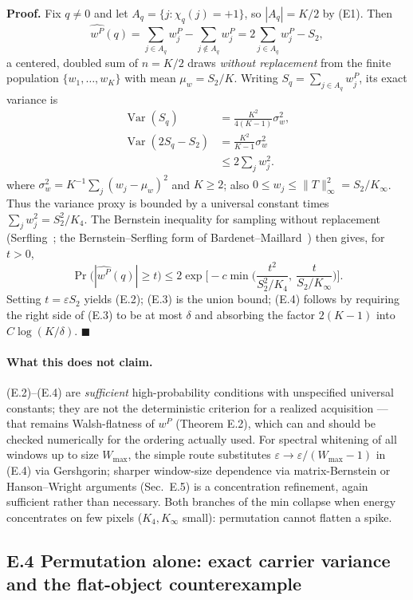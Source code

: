 \noindent\textbf{Proof.} Fix $q\neq0$ and let $A_q=\{j:\chi_q(j)=+1\}$, so $|A_q|=K/2$ by (E1). Then
\[
\widehat{w^P}(q)=\sum_{j\in A_q}w^P_j-\sum_{j\notin A_q}w^P_j=2\sum_{j\in A_q}w^P_j-S_2,
\]
a centered, doubled sum of $n=K/2$ draws \emph{without replacement} from the finite population $\{w_1,\dots,w_K\}$ with mean $\mu_w=S_2/K$. Writing $S_q=\sum_{j\in A_q}w_j^P$, its exact variance is
\[
\begin{aligned}
\operatorname{Var}(S_q)
  &=\frac{K^2}{4(K-1)}\sigma_w^2,\\
\operatorname{Var}(2S_q-S_2)
  &=\frac{K^2}{K-1}\sigma_w^2\\
  &\le2\sum_jw_j^2.
\end{aligned}
\]
where $\sigma_w^2=K^{-1}\sum_j(w_j-\mu_w)^2$ and $K\ge2$; also $0\le w_j\le\|T\|_\infty^2=S_2/K_\infty$. Thus the variance proxy is bounded by a universal constant times $\sum_jw_j^2=S_2^2/K_4$. The Bernstein inequality for sampling without replacement (Serfling~\cite{Serfling1974}; the Bernstein--Serfling form of Bardenet--Maillard~\cite{BardenetMaillard2015}) then gives, for $t>0$,
\[
\Pr\big(|\widehat{w^P}(q)|\ge t\big)\le2\exp\!\Big[-c\min\Big(\frac{t^2}{S_2^2/K_4},\ \frac{t}{S_2/K_\infty}\Big)\Big].
\]
Setting $t=\varepsilon S_2$ yields (E.2); (E.3) is the union bound; (E.4) follows by requiring the right side of (E.3) to be at most $\delta$ and absorbing the factor $2(K-1)$ into $C\log(K/\delta)$. \hfill$\blacksquare$

\paragraph{What this does not claim.} (E.2)--(E.4) are \emph{sufficient} high-probability conditions with unspecified universal constants; they are not the deterministic criterion for a realized acquisition --- that remains Walsh-flatness of $w^P$ (Theorem E.2), which can and should be checked numerically for the ordering actually used. For spectral whitening of all windows up to size $W_{\max}$, the simple route substitutes $\varepsilon\to\varepsilon/(W_{\max}-1)$ in (E.4) via Gershgorin; sharper window-size dependence via matrix-Bernstein or Hanson--Wright arguments (Sec.~E.5) is a concentration refinement, again sufficient rather than necessary. Both branches of the min collapse when energy concentrates on few pixels ($K_4,K_\infty$ small): permutation cannot flatten a spike.

\subsection{E.4 Permutation alone: exact carrier variance and the flat-object counterexample}

